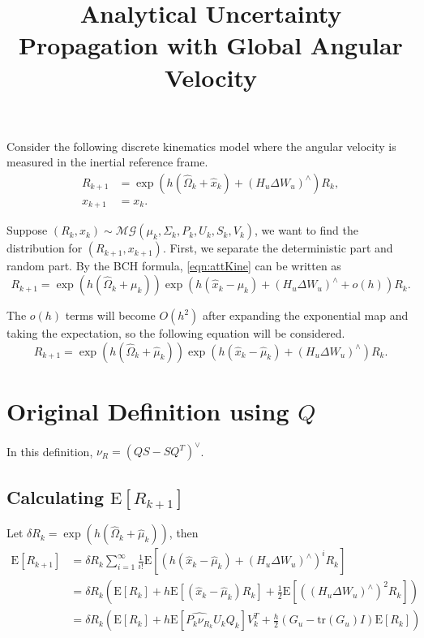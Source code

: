 \documentclass[10pt]{article}
\title{\vspace{-4ex}\textbf{Analytical Uncertainty Propagation with Global Angular Velocity\vspace{-4ex}}}
\date{}
\newcommand{\tr}[1]{\ensuremath{\mathrm{tr}\left( #1 \right)}}
\newcommand{\expect}[1]{\ensuremath{\mathrm{E}\left[ #1 \right]}}
\begin{document}
\maketitle

Consider the following discrete kinematics model where the angular velocity is measured in the inertial reference frame.
\begin{align}
	R_{k+1} &= \exp\left( h(\hat{\Omega}_k+\hat{x}_k) + (H_u\Delta W_u)^\wedge \right)R_k, \label{eqn:attKine} \\
	x_{k+1} &= x_k.
\end{align}

Suppose $(R_k,x_k) \sim \mathcal{MG}(\mu_k,\Sigma_k,P_k,U_k,S_k,V_k)$, we want to find the distribution for $(R_{k+1},x_{k+1})$.
First, we separate the deterministic part and random part.
By the BCH formula, \eqref{eqn:attKine} can be written as
\begin{equation}
	R_{k+1} = \exp\left( h(\hat{\Omega}_k + \mu_k )\right) \exp\left( h(\hat{x}_k-\mu_k) + (H_u\Delta W_u)^\wedge + o(h)\right) R_k.
\end{equation}

The $o(h)$ terms will become $O(h^2)$ after expanding the exponential map and taking the expectation, so the following equation will be considered.
\begin{equation}
	R_{k+1} = \exp\left( h(\hat{\Omega}_k + \hat{\mu}_k )\right) \exp\left( h(\hat{x}_k-\hat{\mu}_k) + (H_u\Delta W_u)^\wedge\right) R_k.
\end{equation}

\section{Original Definition using $Q$}

In this definition, $\nu_R = (QS-SQ^T)^\vee$.

\subsection{Calculating $\expect{R_{k+1}}$}

Let $\delta R_k = \exp\left(h(\hat{\Omega}_k+\hat{\mu}_k)\right)$, then
\begin{align*}
	\expect{R_{k+1}} &= \delta R_k \sum_{i=1}^{\infty} \frac{1}{i!} \expect{\left(h(\hat{x}_k-\hat{\mu}_k)+(H_u\Delta W_u)^\wedge\right)^i R_k} \\
	&= \delta R_k \left( \expect{R_k} + h\expect{(\hat{x}_k-\hat{\mu}_k)R_k} + \frac{1}{2}\expect{((H_u\Delta W_u)^\wedge)^2R_k} \right) \\
	&= \delta R_k \left( \expect{R_k} + h\expect{\widehat{P_k\nu_{R_k}}U_kQ_k}V_k^T + \frac{h}{2}(G_u-\tr{G_u}I)\expect{R_k} \right)
\end{align*}
\end{document}
